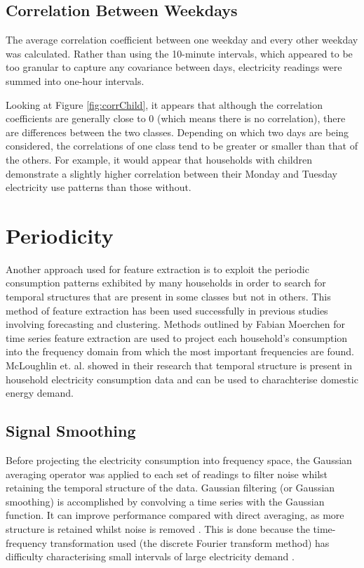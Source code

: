 
\subsection*{Correlation Between Weekdays}

The average correlation coefficient between one weekday and every other weekday was calculated. Rather than using the 10-minute intervals, which appeared to be too granular to capture any covariance between days, electricity readings were summed into one-hour intervals.



Looking at Figure \ref{fig:corrChild}, it appears that although the correlation coefficients are generally close to 0 (which means there is no correlation), there are differences between the two classes. Depending on which two days are being considered, the correlations of one class tend to be greater or smaller than that of the others. For example, it would appear that households with children demonstrate a slightly higher correlation between their Monday and Tuesday electricity use patterns than those without.



\section{Periodicity}

Another approach used for feature extraction is to exploit the periodic consumption patterns exhibited by many households in order to search for temporal structures that are present in some classes but not in others. This method of feature extraction has been used successfully in previous studies involving forecasting and clustering. Methods outlined by Fabian Moerchen \cite{Moerchen} for time series feature extraction are used to project each household's consumption into the frequency domain from which the most important frequencies are found. McLoughlin et. al. \cite{McLoughlin} showed in their research that temporal structure is present in household electricity consumption data and can be used to charachterise domestic energy demand.


\subsection*{Signal Smoothing}

Before projecting the electricity consumption into frequency space, the Gaussian averaging operator was applied to each set of readings to filter noise whilst retaining the temporal structure of the data. Gaussian filtering (or Gaussian smoothing) is accomplished by convolving a time series with the Gaussian function. It can improve performance compared with direct averaging, as more structure is retained whilst noise is removed \cite{Nixon}. This is done because the time-frequency transformation used (the discrete Fourier transform method) has difficulty characterising small intervals of large electricity demand \cite{Graps}.



